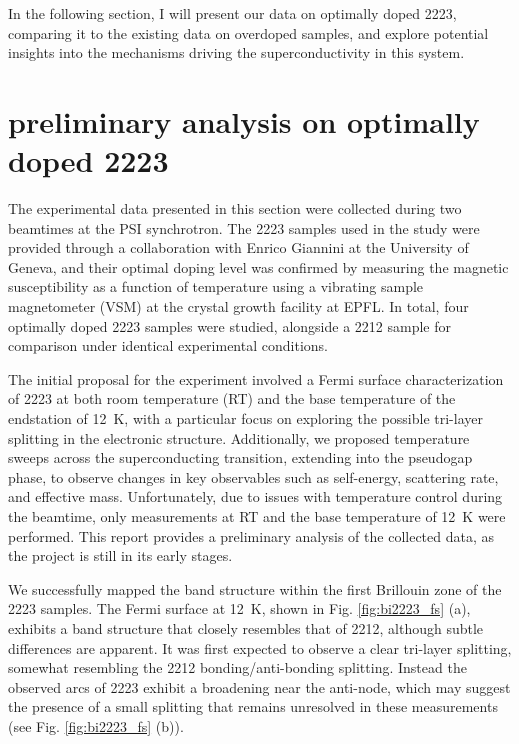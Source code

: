 In the following section, I will present our data on optimally doped 2223, comparing it to the existing data on overdoped samples, and explore potential insights into the mechanisms driving the superconductivity in this system.

\section{preliminary analysis on optimally doped 2223}

The experimental data presented in this section were collected during two beamtimes at the PSI synchrotron.
The 2223 samples used in the study were provided through a collaboration with Enrico Giannini at the University of Geneva, and their optimal doping level was confirmed by measuring the magnetic susceptibility as a function of temperature using a vibrating sample magnetometer (VSM) at the crystal growth facility at EPFL.
In total, four optimally doped 2223 samples were studied, alongside a 2212 sample for comparison under identical experimental conditions.

The initial proposal for the experiment involved a Fermi surface characterization of 2223 at both room temperature (RT) and the base temperature of the endstation of \qty{12}{\kelvin}, with a particular focus on exploring the possible tri-layer splitting in the electronic structure.
Additionally, we proposed temperature sweeps across the superconducting transition, extending into the pseudogap phase, to observe changes in key observables such as self-energy, scattering rate, and effective mass.
Unfortunately, due to issues with temperature control during the beamtime, only measurements at RT and the base temperature of \qty{12}{\kelvin} were performed.
This report provides a preliminary analysis of the collected data, as the project is still in its early stages.

We successfully mapped the band structure within the first Brillouin zone of the 2223 samples.
The Fermi surface at \qty{12}{\kelvin}, shown in Fig. \ref{fig:bi2223_fs} (a), exhibits a band structure that closely resembles that of 2212, although subtle differences are apparent.
It was first expected to observe a clear tri-layer splitting, somewhat resembling the 2212 bonding/anti-bonding splitting.
Instead the observed arcs of 2223 exhibit a broadening near the anti-node, which may suggest the presence of a small splitting that remains unresolved in these measurements (see Fig. \ref{fig:bi2223_fs} (b)).

